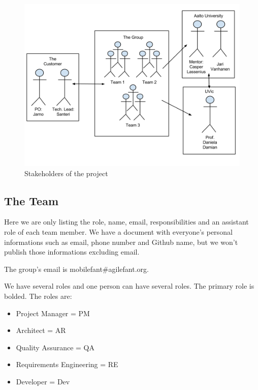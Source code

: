 \begin{figure}[H]
\centering
\includegraphics[width=1\textwidth]{imgs/stakeholders.png}
\caption{Stakeholders of the project}
\label{fig:stakeholders}
\end{figure}

\subsection{The Team}

Here we are only listing the role, name, email, responsibilities and an 
assistant role of each team member. We have a document with everyone's personal 
informations such as email, phone number and Github name, but we won't publish 
those informations excluding email.

The group's email is mobilefant\#agilefant.org.

We have several roles and one person can have several roles. The primary role is bolded. The roles are:

\begin{itemize}
\item Project Manager = PM
\item Architect = AR
\item Quality Assurance = QA
\item Requirements Engineering = RE
\item Developer = Dev
\end{itemize}


